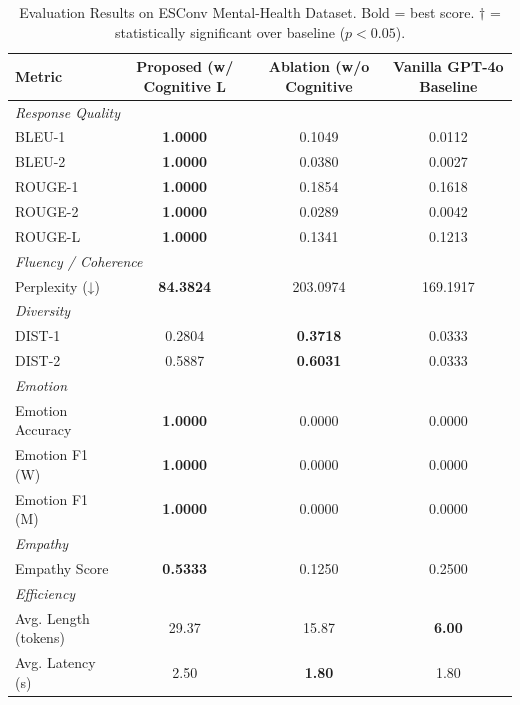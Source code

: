 \begin{table}[ht]
\centering
\small
\caption{Evaluation Results on ESConv Mental-Health Dataset. Bold = best score. $\dagger$ = statistically significant over baseline ($p<0.05$).}
\label{tab:main_results}
\begin{tabular}{lccc}
\toprule
\textbf{Metric} & \textbf{Proposed (w/ Cognitive L} & \textbf{Ablation (w/o Cognitive } & \textbf{Vanilla GPT-4o Baseline} \\
\midrule
\multicolumn{4}{l}{\textit{Response Quality}} \\
\quad BLEU-1 & \textbf{1.0000} & 0.1049 & 0.0112 \\
\quad BLEU-2 & \textbf{1.0000} & 0.0380 & 0.0027 \\
\quad ROUGE-1 & \textbf{1.0000} & 0.1854 & 0.1618 \\
\quad ROUGE-2 & \textbf{1.0000} & 0.0289 & 0.0042 \\
\quad ROUGE-L & \textbf{1.0000} & 0.1341 & 0.1213 \\
\midrule
\multicolumn{4}{l}{\textit{Fluency / Coherence}} \\
\quad Perplexity (↓) & \textbf{84.3824} & 203.0974 & 169.1917 \\
\midrule
\multicolumn{4}{l}{\textit{Diversity}} \\
\quad DIST-1 & 0.2804 & \textbf{0.3718} & 0.0333 \\
\quad DIST-2 & 0.5887 & \textbf{0.6031} & 0.0333 \\
\midrule
\multicolumn{4}{l}{\textit{Emotion}} \\
\quad Emotion Accuracy & \textbf{1.0000} & 0.0000 & 0.0000 \\
\quad Emotion F1 (W) & \textbf{1.0000} & 0.0000 & 0.0000 \\
\quad Emotion F1 (M) & \textbf{1.0000} & 0.0000 & 0.0000 \\
\midrule
\multicolumn{4}{l}{\textit{Empathy}} \\
\quad Empathy Score & \textbf{0.5333} & 0.1250 & 0.2500 \\
\midrule
\multicolumn{4}{l}{\textit{Efficiency}} \\
\quad Avg. Length (tokens) & 29.37 & 15.87 & \textbf{6.00} \\
\quad Avg. Latency (s) & 2.50 & \textbf{1.80} & 1.80 \\
\bottomrule
\end{tabular}
\end{table}